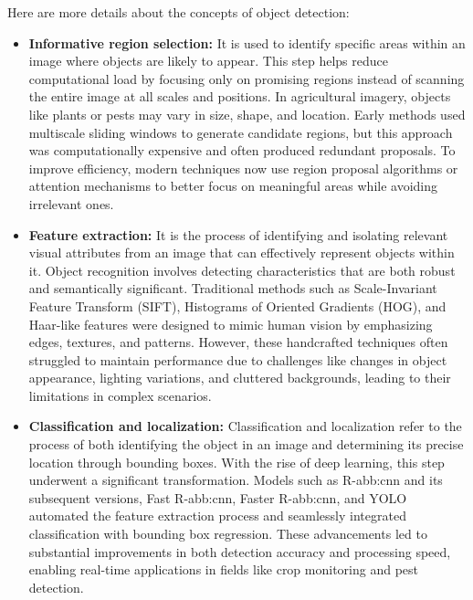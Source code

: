 Here are more details about the concepts of object detection: 
\begin{itemize}
    \item \textbf{Informative region selection:} It is used to identify specific areas within an image where objects are likely to appear. This step helps reduce computational load by focusing only on promising regions instead of scanning the entire image at all scales and positions. In agricultural imagery, objects like plants or pests may vary in size, shape, and location. Early methods used multiscale sliding windows to generate candidate regions, but this approach was computationally expensive and often produced redundant proposals. To improve efficiency, modern techniques now use region proposal algorithms or attention mechanisms to better focus on meaningful areas while avoiding irrelevant ones.
    \item \textbf{Feature extraction:} It is the process of identifying and isolating relevant visual attributes from an image that can effectively represent objects within it. Object recognition involves detecting characteristics that are both robust and semantically significant. Traditional methods such as Scale-Invariant Feature Transform (SIFT), Histograms of Oriented Gradients (HOG), and Haar-like features were designed to mimic human vision by emphasizing edges, textures, and patterns. However, these handcrafted techniques often struggled to maintain performance due to challenges like changes in object appearance, lighting variations, and cluttered backgrounds, leading to their limitations in complex scenarios.
    \item \textbf{Classification and localization:} Classification and localization refer to the process of both identifying the object in an image and determining its precise location through bounding boxes. With the rise of deep learning, this step underwent a significant transformation. Models such as R-\gls{abb:cnn} and its subsequent versions, Fast R-\gls{abb:cnn}, Faster R-\gls{abb:cnn}, and YOLO automated the feature extraction process and seamlessly integrated classification with bounding box regression. These advancements led to substantial improvements in both detection accuracy and processing speed, enabling real-time applications in fields like crop monitoring and pest detection.
\end{itemize}

